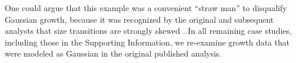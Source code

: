 \documentclass[12pt]{article}
\begin{document}
\begin{spacing}{1.9}


One could argue that this example was a convenient ``straw man'' to disqualify Gaussian growth, because it was recognized by the original and subsequent analysts that size transitions are strongly skewed \citep{shriver2012comparative,peterson2019improving}. 
In all remaining case studies, including those in the Supporting Information, we re-examine growth data that were modeled as Gaussian in the original published analysis.  


\end{spacing}
\end{document}

